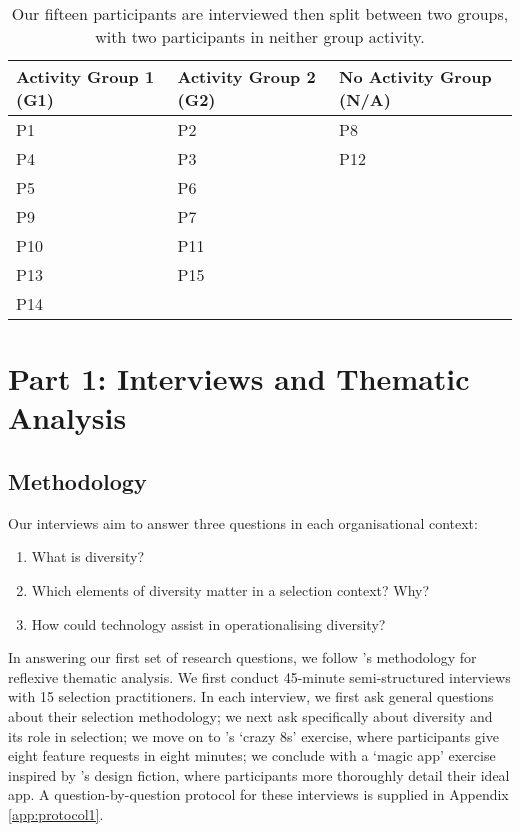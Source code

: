 \begin{center}
\begin{table}[htbp]
    \centering
    \caption{Our fifteen participants are interviewed then split between two groups, with two participants in neither group activity.}
    \label{tab:participants}
    \begin{tabular}{l l l}
        \toprule
        Activity Group 1 (G1) & Activity Group 2 (G2) & No Activity Group (N/A)\\
        \midrule
        P1 & P2 & P8 \\
        P4 & P3 & P12 \\
        P5 & P6 & \\
        P9 & P7 & \\
        P10 & P11 & \\
        P13 & P15 & \\
        P14 & & \\
        \bottomrule
    \end{tabular}
\end{table}
\end{center}

\section{Part 1: Interviews and Thematic Analysis}\label{sec:study1}
\subsection{Methodology}\label{ssec:methods1}
Our interviews aim to answer three questions in each organisational context:

\begin{enumerate}
    \item What is diversity?
    \item Which elements of diversity matter in a selection context? Why?
    \item How could technology assist in operationalising diversity?
\end{enumerate}

In answering our first set of research questions, we follow \textcite{braun_using_2006}'s methodology for reflexive thematic analysis. We first conduct 45-minute semi-structured interviews with 15 selection practitioners. In each interview, we first ask general questions about their selection methodology; we next ask specifically about diversity and its role in selection; we move on to \textcite{Knapp_Zeratzky_Kowitz_2016}'s `crazy 8s' exercise, where participants give eight feature requests in eight minutes; we conclude with a `magic app' exercise inspired by \textcite{blythe2014research}'s design fiction, where participants more thoroughly detail their ideal app. A question-by-question protocol for these interviews is supplied in Appendix \ref{app:protocol1}.

